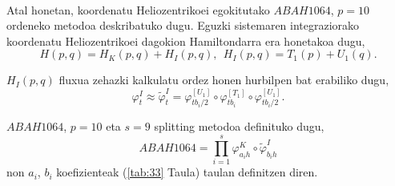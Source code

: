 \paragraph*{}Atal honetan, koordenatu Heliozentrikoei egokitutako $ABAH1064$, $p=10$ ordeneko metodoa deskribatuko dugu.  
Eguzki sistemaren integraziorako koordenatu Heliozentrikoei dagokion Hamiltondarra era honetakoa dugu,
\begin{equation*}
H(p,q)=H_K(p,q)+H_I(p,q), \ \ H_I(p,q)=T_1(p)+U_1(q). 
\end{equation*}

$H_I(p,q)$ fluxua zehazki kalkulatu ordez honen hurbilpen bat erabiliko dugu,
\begin{equation*}
\varphi_t^I \approx \tilde{\varphi}_t^I= \varphi_{{tb_i}/{2}}^{[U_1]} \circ \varphi_{tb_i}^{[T_1]} \circ \varphi_{{tb_i}/{2}}^{[U_1]}.
\end{equation*}

$ABAH1064$, $p=10$ eta $s=9$ splitting metodoa definituko dugu,
\begin{equation*}
ABAH1064=\prod\limits_{i=1}^{s} \varphi_{a_ih}^K \circ \tilde{\varphi}_{b_ih}^I
\end{equation*}
non $a_i$, $b_i$ koefizienteak (\ref{tab:33} Taula) taulan definitzen diren.  

\begin{table}
\centering
\caption[$ABAH1064$ splitting metodoa.] 
{\small{$ABAH1064$ splitting metodoa \cite{Blanes2013}.}}
\label{tab:33}       %
\centering
{}
\end{table}


